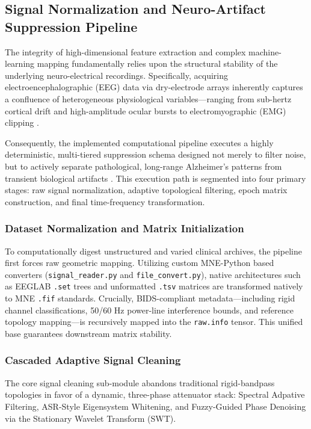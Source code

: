 \subsection{Signal Normalization and Neuro-Artifact Suppression Pipeline}
\label{subsec:preprocessing_pipeline}

The integrity of high-dimensional feature extraction and complex machine-learning mapping fundamentally relies upon the structural stability of the underlying neuro-electrical recordings. Specifically, acquiring electroencephalographic (EEG) data via dry-electrode arrays inherently captures a confluence of heterogeneous physiological variables—ranging from sub-hertz cortical drift and high-amplitude ocular bursts to electromyographic (EMG) clipping \cite{jeong2004eeg}. 

Consequently, the implemented computational pipeline executes a highly deterministic, multi-tiered suppression schema designed not merely to filter noise, but to actively separate pathological, long-range Alzheimer's patterns from transient biological artifacts \cite{cassani2020review}. This execution path is segmented into four primary stages: raw signal normalization, adaptive topological filtering, epoch matrix construction, and final time-frequency transformation.

\subsubsection{Dataset Normalization and Matrix Initialization}
To computationally digest unstructured and varied clinical archives, the pipeline first forces raw geometric mapping. Utilizing custom MNE-Python based converters (\texttt{signal\_reader.py} and \texttt{file\_convert.py}), native architectures such as EEGLAB \texttt{.set} trees and unformatted \texttt{.tsv} matrices are transformed natively to MNE \texttt{.fif} standards. Crucially, BIDS-compliant metadata—including rigid channel classifications, 50/60 Hz power-line interference bounds, and reference topology mapping—is recursively mapped into the \texttt{raw.info} tensor. This unified base guarantees downstream matrix stability.

\subsubsection{Cascaded Adaptive Signal Cleaning}
The core signal cleaning sub-module abandons traditional rigid-bandpass topologies in favor of a dynamic, three-phase attenuator stack: Spectral Adpative Filtering, ASR-Style Eigensystem Whitening, and Fuzzy-Guided Phase Denoising via the Stationary Wavelet Transform (SWT).


